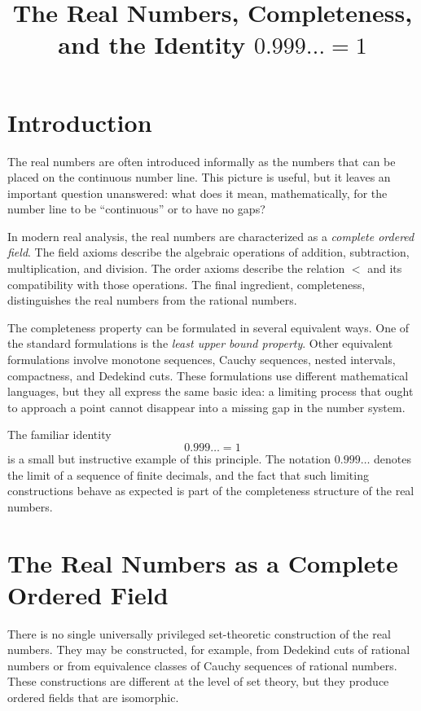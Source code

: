 \documentclass{essay}
\title{The Real Numbers, Completeness, and the Identity \(0.999\ldots = 1\)}
\author{}
\date{}
\begin{document}
\maketitle
\tableofcontents

\section{Introduction}

The real numbers are often introduced informally as the numbers that can be placed on the continuous number line. This picture is useful, but it leaves an important question unanswered: what does it mean, mathematically, for the number line to be ``continuous'' or to have no gaps?

In modern real analysis, the real numbers are characterized as a \emph{complete ordered field}. The field axioms describe the algebraic operations of addition, subtraction, multiplication, and division. The order axioms describe the relation \(<\) and its compatibility with those operations. The final ingredient, completeness, distinguishes the real numbers from the rational numbers.

The completeness property can be formulated in several equivalent ways. One of the standard formulations is the \emph{least upper bound property}. Other equivalent formulations involve monotone sequences, Cauchy sequences, nested intervals, compactness, and Dedekind cuts. These formulations use different mathematical languages, but they all express the same basic idea: a limiting process that ought to approach a point cannot disappear into a missing gap in the number system.

The familiar identity
\[
0.999\ldots = 1
\]
is a small but instructive example of this principle. The notation \(0.999\ldots\) denotes the limit of a sequence of finite decimals, and the fact that such limiting constructions behave as expected is part of the completeness structure of the real numbers.

\section{The Real Numbers as a Complete Ordered Field}

There is no single universally privileged set-theoretic construction of the real numbers. They may be constructed, for example, from Dedekind cuts of rational numbers or from equivalence classes of Cauchy sequences of rational numbers. These constructions are different at the level of set theory, but they produce ordered fields that are isomorphic.
\end{document}
